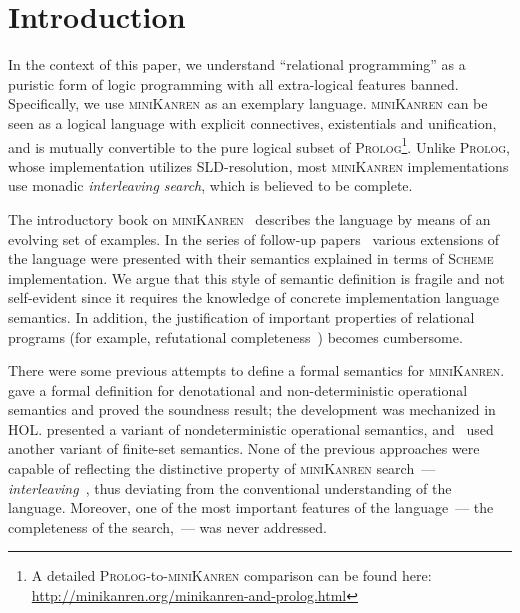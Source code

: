 \section{Introduction}

In the context of this paper, we understand ``relational programming'' as a puristic form of logic programming with all extra-logical
features banned. Specifically, we use \textsc{miniKanren} as an exemplary language. \textsc{miniKanren} can be seen as
a logical language with explicit connectives, existentials and unification, and is mutually convertible to the pure logical subset of
\textsc{Prolog}\footnote{A detailed \textsc{Prolog}-to-\textsc{miniKanren} comparison can be found here: \url{http://minikanren.org/minikanren-and-prolog.html}}.
Unlike \textsc{Prolog}, whose implementation utilizes SLD-resolution, most \textsc{miniKanren} implementations use monadic \emph{interleaving
search}, which is believed to be complete.

The introductory book on \textsc{miniKanren}~\cite{TRS} describes the language by means of an evolving set of examples. In the
series of follow-up papers~\cite{MicroKanren,CKanren,CKanren1,AlphaKanren,2016,Guided} various extensions of the language were presented with
their semantics explained in terms of \textsc{Scheme} implementation. We argue that this style of semantic definition is
fragile and not self-evident since it requires the knowledge of concrete implementation language semantics. In addition, the justification of
important properties of relational programs (for example, refutational completeness~\cite{WillThesis}) becomes cumbersome.

There were some previous attempts to define a formal semantics for \textsc{miniKanren}. \citet{MechanisingMiniKanren} gave a formal definition
for denotational and non-deterministic operational semantics and proved the soundness result; the development was mechanized in HOL. 
\citet{RelConversion} presented a variant of nondeterministic operational semantics, and~\citet{DivTest} used another variant of finite-set semantics.
None of the previous approaches were capable of reflecting the distinctive property of \textsc{miniKanren} search~--- \emph{interleaving}~\cite{Search},
thus deviating from the conventional understanding of the language. Moreover, one of the most important features of the
language~--- the completeness of the search,~--- was never addressed.

